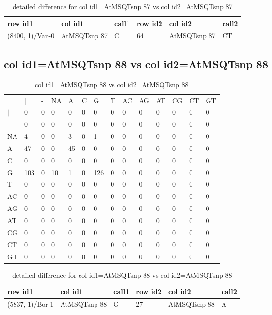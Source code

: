 \begin{center}
\begin{longtable}{|l|l|l|l|l|l|}
\caption{detailed difference for col id1=AtMSQTsnp 87 vs col id2=AtMSQTsnp 87} \label{table_dm967}\\
\hline
row id1&col id1&call1&row id2&col id2&call2\\
\hline
(8400, 1)/Van-0&AtMSQTsnp 87&C&64&AtMSQTsnp 87&CT\\
\hline
\end{longtable}
\end{center}

\subsection{col id1=AtMSQTsnp 88 vs col id2=AtMSQTsnp 88}
\begin{center}
\begin{longtable}{|l|l|l|l|l|l|l|l|l|l|l|l|l|l|}
\caption{col id1=AtMSQTsnp 88 vs col id2=AtMSQTsnp 88} \label{table_dm968}\\
\hline
\\
\hline
&$|$&-&NA&A&C&G&T&AC&AG&AT&CG&CT&GT\\
$|$&0&0&0&0&0&0&0&0&0&0&0&0&0\\
-&0&0&0&0&0&0&0&0&0&0&0&0&0\\
NA&4&0&0&3&0&1&0&0&0&0&0&0&0\\
A&47&0&0&45&0&0&0&0&0&0&0&0&0\\
C&0&0&0&0&0&0&0&0&0&0&0&0&0\\
G&103&0&10&1&0&126&0&0&0&0&0&0&0\\
T&0&0&0&0&0&0&0&0&0&0&0&0&0\\
AC&0&0&0&0&0&0&0&0&0&0&0&0&0\\
AG&0&0&0&0&0&0&0&0&0&0&0&0&0\\
AT&0&0&0&0&0&0&0&0&0&0&0&0&0\\
CG&0&0&0&0&0&0&0&0&0&0&0&0&0\\
CT&0&0&0&0&0&0&0&0&0&0&0&0&0\\
GT&0&0&0&0&0&0&0&0&0&0&0&0&0\\
\hline
\end{longtable}
\end{center}

\begin{center}
\begin{longtable}{|l|l|l|l|l|l|}
\caption{detailed difference for col id1=AtMSQTsnp 88 vs col id2=AtMSQTsnp 88} \label{table_dm969}\\
\hline
row id1&col id1&call1&row id2&col id2&call2\\
\hline
(5837, 1)/Bor-1&AtMSQTsnp 88&G&27&AtMSQTsnp 88&A\\
\hline
\end{longtable}
\end{center}

